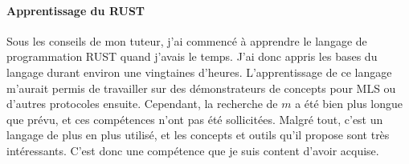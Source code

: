 	\paragraph{Apprentissage du RUST} Sous les conseils de mon tuteur, j'ai
	commencé à apprendre le langage de programmation RUST quand j'avais le temps.
	J'ai donc appris les bases du langage durant environ une vingtaines d'heures.
	L'apprentissage de ce langage m'aurait permis de travailler sur des
	démonstrateurs de concepts pour MLS ou d'autres protocoles ensuite. Cependant,
	la recherche de $m$ a été bien plus longue que prévu, et ces compétences n'ont
	pas été sollicitées. Malgré tout, c'est un langage de plus en plus utilisé, et
	les concepts et outils qu'il propose sont très intéressants. C'est donc une
	compétence que je suis content d'avoir acquise.
